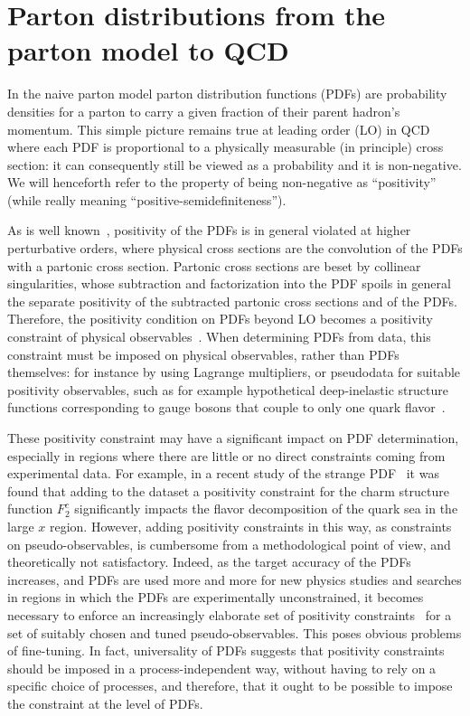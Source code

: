 \section{Parton distributions from the parton model to QCD}
\label{sec:intro}

In the naive parton model parton distribution functions (PDFs) are probability
densities for a parton to carry a given fraction of their parent hadron's
momentum. This simple picture remains true at leading order (LO) in QCD where
each PDF is proportional to a physically measurable (in principle) cross
section: it can consequently still be viewed as a probability and it is
non-negative. We will henceforth refer to the property of being non-negative as
``positivity'' (while really meaning ``positive-semidefiniteness'').

As is well known~\cite{Altarelli:1998gn}, positivity of the PDFs is in general
violated at higher perturbative orders, where physical cross sections are the
convolution of the PDFs with a partonic cross section.
Partonic cross sections are beset by collinear singularities, whose subtraction
and factorization into the PDF spoils in general the separate positivity of the
subtracted partonic cross sections and of the PDFs.
Therefore, the positivity condition on PDFs beyond LO becomes a positivity
constraint of physical observables~\cite{Altarelli:1998gn,Forte:1998kd}. 
When determining
PDFs from data, this constraint must be imposed on physical observables, rather
than PDFs themselves: for instance by using Lagrange multipliers, or pseudodata
for suitable positivity observables, such as for example hypothetical
deep-inelastic structure functions corresponding to gauge bosons that couple to
only one quark flavor~\cite{Ball:2008by}.


These positivity constraint 
may have a significant impact on
PDF determination, especially in regions where there are little or no direct
constraints coming from experimental data. For example, in a recent
study of the strange PDF~\cite{Faura:2020oom} it was found that
adding to the dataset a positivity constraint for the charm structure
function $F_2^c$ significantly impacts the flavor decomposition of the
quark sea in the
large $x$ region. However, adding positivity constraints in this way,
as constraints on pseudo-observables, is cumbersome from a methodological point
of view, and theoretically not satisfactory. Indeed, as  the target
accuracy of the PDFs increases, and PDFs are used more and more
for new physics studies and searches in regions in which the PDFs are
experimentally 
unconstrained, it becomes necessary to enforce 
an increasingly
elaborate set of positivity
constraints~\cite{Ball:2010de,Ball:2014uwa} for
a set of suitably chosen and tuned pseudo-observables. This poses
obvious problems of fine-tuning. In fact,
universality of PDFs suggests that  positivity constraints
should be imposed in a process-independent way, without having to rely
on a specific choice  of processes, and therefore, that it ought to be
possible to impose the constraint at the level of PDFs.

